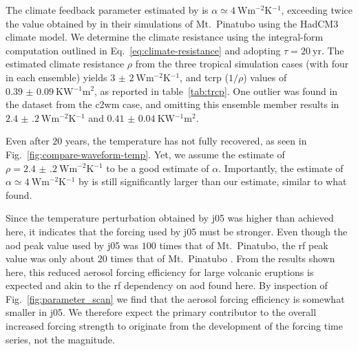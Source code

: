 \documentclass{ametsocV6.1}
\begin{document}
The climate feedback parameter estimated by \citet{jones2005} is \(\alpha \simeq
\SI{4}{\watt\metre^{-2}\kelvin^{-1}}\), exceeding twice the value obtained by
\citet{gregory2016} in their simulations of Mt.\ Pinatubo using the HadCM3 climate
model. We determine the climate resistance using the integral-form computation outlined
in Eq.~\ref{eq:climate-resistance} and adopting \(\tau =\SI{20}{\mathrm{yr}}\). The
estimated climate resistance \(\rho \) from the three tropical simulation cases (with
four in each ensemble) yields \(\SI{3(2)}{\watt\metre^{-2}\kelvin^{-1}}\), and
\gls{tcrp} (\(1/\rho\)) values of \(\SI{0.39(9)}{\kelvin\watt^{-1}\metre^{2}}\), as
reported in table~\ref{tab:trcp}. One outlier was found in the dataset from the
\gls{c2wm} case, and omitting this ensemble member results in
\(\SI{2.4(2)}{\watt\metre^{-2}\kelvin^{-1}}\) and
\(\SI{0.41(4)}{\kelvin\watt^{-1}\metre^{2}}\).

Even after \(20\) years, the temperature has not fully recovered, as seen in
Fig.~\ref{fig:compare-waveform-temp}. Yet, we assume the estimate of \(\rho
=\SI{2.4(2)}{\watt\metre^{-2}\kelvin^{-1}}\) to be a good estimate of \(\alpha \).
Importantly, the estimate of \(\alpha \simeq \SI{4}{\watt\metre^{-2}\kelvin^{-1}}\) by
\citet{jones2005} is still significantly larger than our estimate, similar to what
\citet{gregory2016} found.

Since the temperature perturbation obtained by \gls{j05} was higher than achieved here,
it indicates that the forcing used by \gls{j05} must be stronger. Even though the
\gls{aod} peak value used by \gls{j05} was \(100\) times that of Mt.\ Pinatubo, the
\gls{rf} peak value was only about \(20\) times that of Mt.\ Pinatubo
\citep{gregory2016}. From the results shown here, this reduced aerosol forcing
efficiency for large volcanic eruptions is expected and akin to the \gls{rf} dependency
on \gls{aod} found here. By inspection of Fig.~\ref{fig:parameter_scan} we find that the
aerosol forcing efficiency is somewhat smaller in \gls{j05}. We therefore expect the
primary contributor to the overall increased forcing strength to originate from the
development of the forcing time series, not the magnitude.
\end{document}
